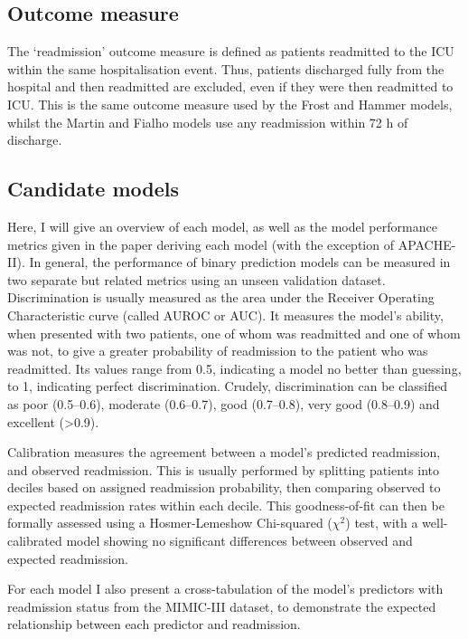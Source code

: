 \documentclass[onecolumn]{article}
\begin{document}
\subsection{Outcome measure}

The `readmission' outcome measure is defined as patients readmitted to the ICU within the same hospitalisation event. Thus, patients discharged fully from the hospital and then readmitted are excluded, even if they were then readmitted to ICU. This is the same outcome measure used by the Frost and Hammer models, whilst the Martin and Fialho models use any readmission within 72 h of discharge.

\subsection{Candidate models}
\label{CandidateModels}

Here, I will give an overview of each model, as well as the model performance metrics given in the paper deriving each model (with the exception of APACHE-II). In general, the performance of binary prediction models can be measured in two separate but related metrics using an unseen validation dataset. Discrimination is usually measured as the area under the Receiver Operating Characteristic curve (called AUROC or AUC). It measures the model's ability, when presented with two patients, one of whom was readmitted and one of whom was not, to give a greater probability of readmission to the patient who was readmitted. Its values range from 0.5, indicating a model no better than guessing, to 1, indicating perfect discrimination. Crudely, discrimination can be classified as poor (0.5--0.6), moderate (0.6--0.7), good (0.7--0.8), very good (0.8--0.9) and excellent (>0.9).

Calibration measures the agreement between a model's predicted readmission, and observed readmission. This is usually performed by splitting patients into deciles based on assigned readmission probability, then comparing observed to expected readmission rates within each decile. This goodness-of-fit can then be formally assessed using a Hosmer-Lemeshow Chi-squared ($ \chi^{2} $) test, with a well-calibrated model showing no significant differences between observed and expected readmission.

For each model I also present a cross-tabulation of the model's predictors with readmission status from the MIMIC-III dataset, to demonstrate the expected relationship between each predictor and readmission.
\end{document}
